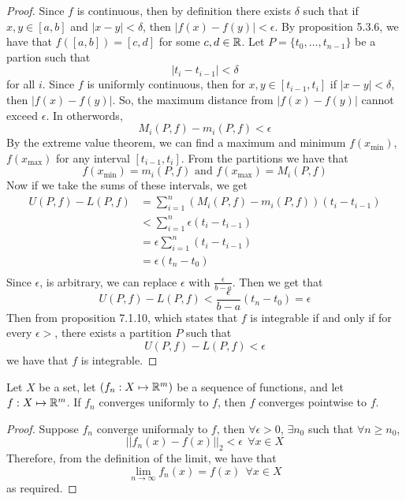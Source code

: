 \documentclass[openany]{report}
\begin{document}
\begin{proof}
    Since $f$ is continuous, then by definition there exists $\delta$ such that if $x,y \in [a,b]$ and $|x - y| < \delta$, then $|f(x) - f(y)| < \epsilon$. By proposition 5.3.6, we have that $f([a,b]) = [c,d]$ for some $c,d \in \mathbb{R}$. Let $P = \{t_0, \ldots, t_{n-1}\}$ be a partion such that 
    \[|t_i - t_{i-1}| < \delta\]
    for all $i$. Since $f$ is uniformly continuous, then for $x,y \in [t_{i-1}, t_i]$ if $|x - y| < \delta$, then $|f(x) - f(y)|$. So, the maximum distance from $|f(x) - f(y)|$ cannot exceed $\epsilon$. In otherwords, 
    \[M_i(P,f) - m_i(P,f) < \epsilon\]
     By the extreme value theorem, we can find a maximum and minimum $f(x_{\min})$, $f(x_{\max})$ for any interval $[t_{i-1}, t_i]$. From the partitions we have that 
    \[f(x_{\min}) = m_i(P,f) \text{ and } f(x_{\max}) = M_i(P,f)\]
    Now if we take the sums of these intervals, we get
    \begin{align*}
        U(P,f) - L(P,f) &= \sum_{i=1}^n (M_i(P,f) - m_i(P,f))(t_i - t_{i-1})\\
        &< \sum_{i=1}^n \epsilon(t_i - t_{i-1})\\
        &= \epsilon \sum_{i=1}^n (t_i - t_{i-1})\\
        &= \epsilon (t_n-t_0)\\
    \end{align*}
    Since $\epsilon$, is arbitrary, we can replace $\epsilon$ with $\frac{\epsilon}{b-a}$. Then we get that
    \[U(P,f) - L(P,f) < \frac{\epsilon}{b-a} (t_n-t_0) = \epsilon\]
    Then from proposition 7.1.10, which states that $f$ is integrable if and only if for every $\epsilon > $, there exists a partition $P$ such that 
    \[U(P,f) - L(P,f) < \epsilon\]
    we have that $f$ is integrable.
\end{proof}
\begin{manualprop}{}
    Let $X$ be a set, let $(f_n: X \mapsto \mathbb{R}^m)$ be a sequence of functions, and let $f: X \mapsto \mathbb{R}^m$. If $f_n$ converges uniformly to $f$, then $f$ converges pointwise to $f$.
\end{manualprop}
\begin{proof}
    Suppose $f_n$ converge uniformaly to $f$, then $\forall \epsilon > 0$, $\exists n_0$ such that $\forall n \geq n_0$, 
    \[||f_n(x) - f(x)||_2 <\epsilon \ \ \forall x \in X\]
    Therefore, from the definition of the limit, we have that 
    \[\lim_{n\rightarrow \infty} f_n(x) = f(x) \ \ \forall x \in X\]
    as required. 
\end{proof}
\end{document}
